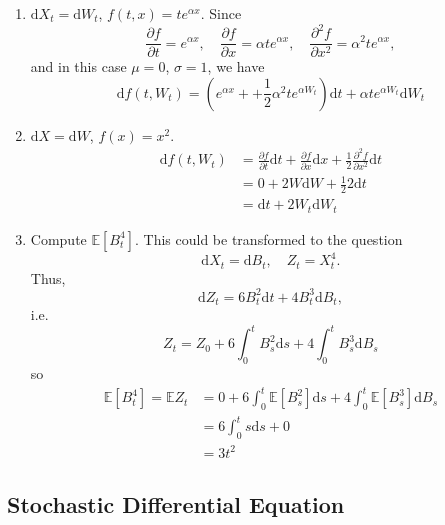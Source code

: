 \documentclass[twocolumn,landscape,10pt]{article}
\theoremstyle{definition}
\begin{document}
\begin{enumerate}
    \item $\mathrm{d}X_t=\mathrm{d}W_t$, $f(t,x)=te^{\alpha x}$.
        Since
        \[
            \frac{\partial f}{\partial t}=e^{\alpha x},\quad
            \frac{\partial f}{\partial x}=\alpha te^{\alpha x},\quad
            \frac{\partial^2 f}{\partial x^2}=\alpha^2te^{\alpha x},
        \]
        and in this case $\mu=0$, $\sigma=1$, we have
        \[
            \mathrm{d}f(t,W_t) = 
            \left(e^{\alpha x}+
            +\frac{1}{2}\alpha^2te^{\alpha W_t}\right)\mathrm{d}t
            +\alpha te^{\alpha W_t}\mathrm{d}W_t
        \]

    \item $\mathrm{d}X=\mathrm{d}W$, $f(x)=x^2$.
        \begin{align*}
            \mathrm{d}f(t,W_t)
            &= \frac{\partial f}{\partial t}\mathrm{d}t
            +\frac{\partial f}{\partial x}\mathrm{d}x
            +\frac{1}{2}\frac{\partial^2 f}{\partial x^2}\mathrm{d}t \\
            &= 0 + 2W\mathrm{d}W + \frac{1}{2}2\mathrm{d}t \\
            &= \mathrm{d}t+2W_t\mathrm{d}W_t
        \end{align*}

    \item Compute $\mathbb{E}\left[B_t^4\right]$. This could be transformed to
        the question
        \[
            \mathrm{d}X_t=\mathrm{d}B_t,\quad
            Z_t=X_t^4.
        \]
        Thus,
        \[
            \mathrm{d}Z_t=6B_t^2\mathrm{d}t+4B_t^3\mathrm{d}B_t,
        \]
        i.e.\
        \[
            Z_t=Z_0 + 6 \int_{0}^{t}B_s^2\mathrm{d}s
            + 4 \int_{0}^{t} B_s^3\mathrm{d}B_s
        \]
        so
        \begin{align*}
            \mathbb{E}[B_t^4]=\mathbb{E}Z_t
            &= 0 + 6 \int_{0}^{t} \mathbb{E}[B_s^2]\mathrm{d}s
            + 4 \int_{0}^{t} \mathbb{E}[B_s^3]\mathrm{d}B_s \\
            &= 6 \int_{0}^{t}s\mathrm{d}s + 0 \\
            &= 3t^2
        \end{align*}
\end{enumerate}

\subsection{Stochastic Differential Equation}
\end{document}
